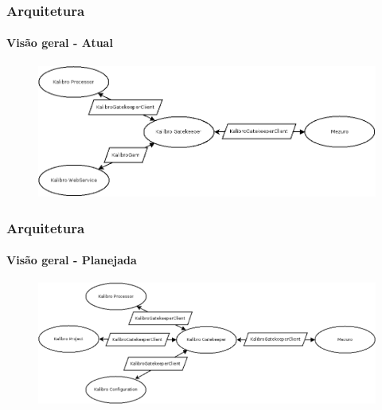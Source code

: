 \documentclass{beamer}
\begin{document}
  \begin{frame}
    \frametitle{Arquitetura}
    \framesubtitle{Visão geral - Atual}

    \begin{figure}[htb]
      \begin{center}
        \includegraphics[scale=0.35]{images/mezuro-architecture-actual.png}
      \end{center}
    \end{figure}
  \end{frame}

  \begin{frame}
    \frametitle{Arquitetura}
    \framesubtitle{Visão geral - Planejada}

    \begin{figure}[htb]
      \begin{center}
        \includegraphics[scale=0.30]{images/mezuro-architecture-predicted.png}
      \end{center}
    \end{figure}
  \end{frame}
\end{document}
